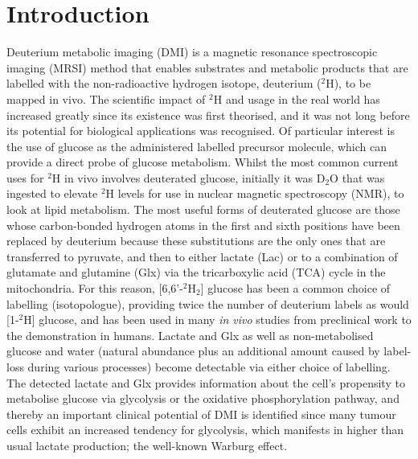 \documentclass[class=article, crop=false]{standalone}
\begin{document}
 
\label{section:Glucose}

\section{Introduction}

Deuterium metabolic imaging (DMI) is a magnetic resonance spectroscopic imaging (MRSI) method that enables substrates and metabolic products that are labelled with the non-radioactive hydrogen isotope, deuterium ($^2$H), to be mapped in vivo. The scientific impact of $^2$H and usage in the real world has increased greatly since its existence was first theorised\cite{Urey1932AConcentration}, and it was not long before its potential for biological applications was recognised\cite{Schoenheimer1935DeuteriumMetabolism, Schoenheimer1938TheMetabolism}. Of particular interest is the use of glucose as the administered labelled precursor molecule, which can provide a direct probe of glucose metabolism. Whilst the most common current uses for $^2$H in vivo involves deuterated glucose, initially it was D$_2$O that was ingested to elevate $^2$H levels for use in nuclear magnetic spectroscopy (NMR)\cite{Brereton1986PreliminarySpectroscopy, Irving1987InSpectroscopy}, to look at lipid metabolism. The most useful forms of deuterated glucose are those whose carbon-bonded hydrogen atoms in the first and sixth positions have been replaced by deuterium because these substitutions are the only ones that are transferred to pyruvate, and then to either lactate (Lac) or to a combination of glutamate and glutamine (Glx) via the tricarboxylic acid (TCA) cycle in the mitochondria. For this reason, [6,6'-$^2$H$_2$] glucose has been a common choice of labelling (isotopologue), providing twice the number of deuterium labels as would [1-$^2$H] glucose, and has been used in many \textit{in vivo} studies from preclinical work\cite{Lu2017QuantitativeSpectroscopy, Meerwaldt2023InImaging} to the demonstration in humans\cite{DeFeyter2018DeuteriumVivo, Roig2022Deuterium7T}. Lactate and Glx as well as non-metabolised glucose and water (natural abundance plus an additional amount caused by label-loss during various processes) become detectable via either choice of labelling. The detected lactate and Glx provides information about the cell’s propensity to metabolise glucose via glycolysis or the oxidative phosphorylation pathway, and thereby an important clinical potential of DMI is identified since many tumour cells exhibit an increased tendency for glycolysis, which manifests in higher than usual lactate production;  the well-known Warburg effect\cite{Warburg1956OnCells}.    
\end{document}
